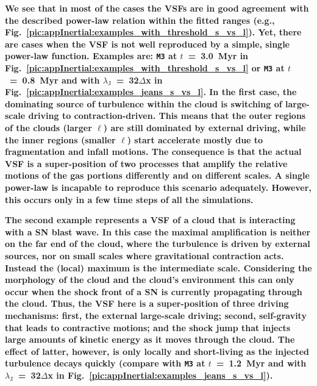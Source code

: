 \textbf{
    We see that in most of the cases the VSFs are in good agreement with the described power-law relation within the fitted ranges (e.g., Fig.~\ref{pic:appInertial:examples_with_threshold_s_vs_l}). 
    Yet, there are cases when the VSF is not well reproduced by a simple, single power-law function.
    Examples are: \texttt{M3} at $t$~=~3.0~Myr in Fig.~\ref{pic:appInertial:examples_with_threshold_s_vs_l} or \texttt{M3} at $t$~=~0.8~Myr and with $\lambda_\mathrm{J}$~=~32$\Delta$x in Fig.~\ref{pic:appInertial:examples_jeans_s_vs_l}.
    In the first case, the dominating source of turbulence within the cloud is switching of large-scale driving to contraction-driven. 
    This means that the outer regions of the clouds (larger $\ell$) are still dominated by external driving, while the inner regions (smaller $\ell$) start accelerate mostly due to fragmentation and infall motions.
    The consequence is that the actual VSF is a super-position of two processes that amplify the relative motions of the gas portions differently and on different scales.
    A single power-law is incapable to reproduce this scenario adequately. 
    However, this occurs only in a few time steps of all the simulations. 
}

\textbf{
    The second example represents a VSF of a cloud that is interacting with a SN blast wave.
    In this case the maximal amplification is neither on the far end of the cloud, where the turbulence is driven by external sources, nor on small scales where gravitational contraction acts.
    Instead the (local) maximum is the intermediate scale. 
    Considering the morphology of the cloud and the cloud's environment this can only occur when the shock front of a SN is currently propagating through the cloud. 
    Thus, the VSF here is a super-position of three driving mechanisms: first, the external large-scale driving; second, self-gravity that leads to contractive motions; and the shock jump that injects large amounts of kinetic energy as it moves through the cloud. 
    The effect of latter, however, is only locally and short-living as the injected turbulence decays quickly (compare with \texttt{M3} at $t$~=~1.2~Myr and with $\lambda_\mathrm{J}$~=~32$\Delta$x in Fig.~\ref{pic:appInertial:examples_jeans_s_vs_l}).
}

